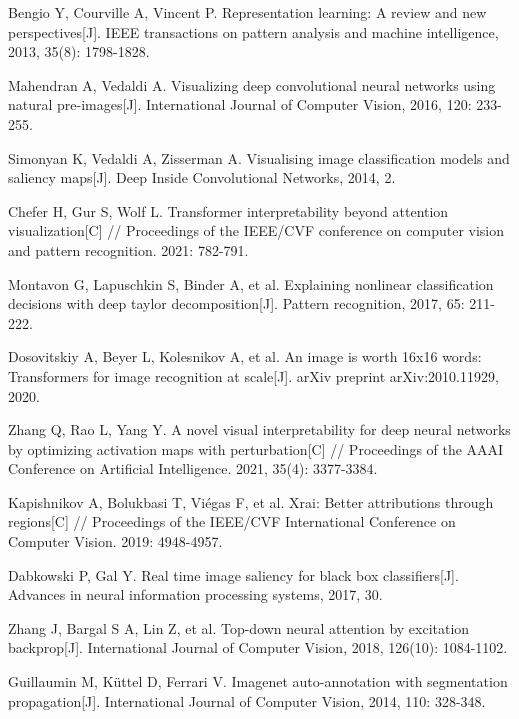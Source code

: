\begin{thebibliography}{200}
Bengio Y, Courville A, Vincent P. Representation learning: A review and new perspectives[J]. IEEE transactions on pattern analysis and machine intelligence, 2013, 35(8): 1798-1828.

Mahendran A, Vedaldi A. Visualizing deep convolutional neural networks using natural pre-images[J]. International Journal of Computer Vision, 2016, 120: 233-255.

Simonyan K, Vedaldi A, Zisserman A. Visualising image classification models and saliency maps[J]. Deep Inside Convolutional Networks, 2014, 2.

Chefer H, Gur S, Wolf L. Transformer interpretability beyond attention visualization[C] // Proceedings of the IEEE/CVF conference on computer vision and pattern recognition. 2021: 782-791.

Montavon G, Lapuschkin S, Binder A, et al. Explaining nonlinear classification decisions with deep taylor decomposition[J]. Pattern recognition, 2017, 65: 211-222.

Dosovitskiy A, Beyer L, Kolesnikov A, et al. An image is worth 16x16 words: Transformers for image recognition at scale[J]. arXiv preprint arXiv:2010.11929, 2020.

Zhang Q, Rao L, Yang Y. A novel visual interpretability for deep neural networks by optimizing activation maps with perturbation[C] // Proceedings of the AAAI Conference on Artificial Intelligence. 2021, 35(4): 3377-3384.

Kapishnikov A, Bolukbasi T, Viégas F, et al. Xrai: Better attributions through regions[C] // Proceedings of the IEEE/CVF International Conference on Computer Vision. 2019: 4948-4957.

Dabkowski P, Gal Y. Real time image saliency for black box classifiers[J]. Advances in neural information processing systems, 2017, 30.

Zhang J, Bargal S A, Lin Z, et al. Top-down neural attention by excitation backprop[J]. International Journal of Computer Vision, 2018, 126(10): 1084-1102.

Guillaumin M, Küttel D, Ferrari V. Imagenet auto-annotation with segmentation propagation[J]. International Journal of Computer Vision, 2014, 110: 328-348.



\end{thebibliography}

%



%





\clearpage